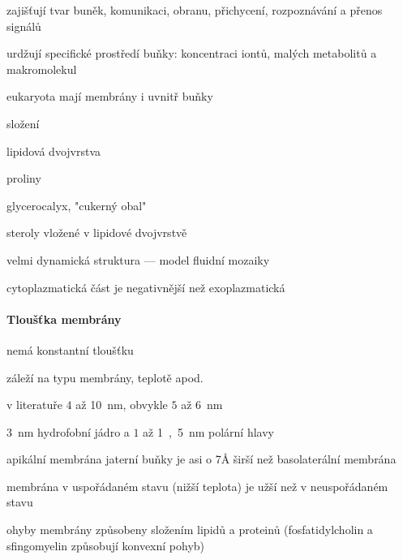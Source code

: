 \documentclass[DIV=8]{scrreprt}
\begin{document}
\begin{myItemize}[nosep]
    \item zajišťují tvar buněk, komunikaci, obranu, přichycení, rozpoznávání a přenos signálů
    \item urdžují specifické prostředí buňky: koncentraci iontů, malých metabolitů a makromolekul
    \item eukaryota mají membrány i uvnitř buňky
    \item složení
\begin{myItemize}[nosep]
    \item lipidová dvojvrstva
    \item proliny
    \item glycerocalyx, "cukerný obal"
    \item steroly vložené v lipidové dvojvrstvě
\end{myItemize}

    \item velmi dynamická struktura --- model fluidní mozaiky
    \item cytoplazmatická část je negativnější než exoplazmatická
\end{myItemize}



\paragraph{Tloušťka membrány}
\begin{myItemize}[nosep]
    \item nemá konstantní tloušťku
\begin{myItemize}[nosep]
    \item záleží na typu membrány, teplotě apod.
    \item v literatuře \(4\) až \si{10 nm}, obvykle \(5\) až \si{6 nm}
\end{myItemize}

    \item \si{3 nm} hydrofobní jádro a \(1\) až \si{1,5 nm} polární hlavy
    \item apikální membrána jaterní buňky je asi o 7Å širší než basolaterální membrána
    \item membrána v uspořádaném stavu (nižší teplota) je užší než v neuspořádaném stavu
    \item ohyby membrány způsobeny složením lipidů a proteinů (fosfatidylcholin a sfingomyelin způsobují konvexní pohyb)
\end{myItemize}
\end{document}
